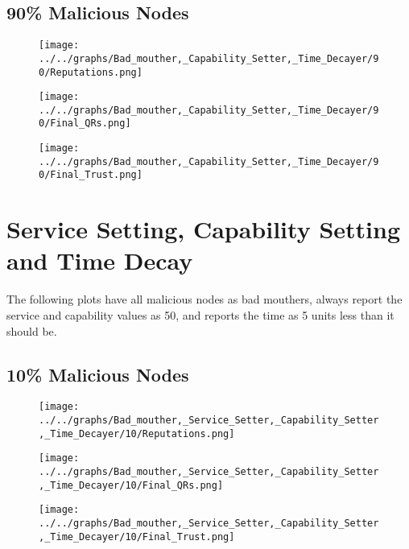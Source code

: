 \begin{minipage}[t]{0.49\columnwidth}
\subsection*{90\% Malicious Nodes}
    \begin{figure}[H]
        \centering
        \texttt{[image: ../../graphs/Bad\_mouther,\_Capability\_Setter,\_Time\_Decayer/90/Reputations.png]}
    \end{figure}
    \begin{figure}[H]
        \centering
        \texttt{[image: ../../graphs/Bad\_mouther,\_Capability\_Setter,\_Time\_Decayer/90/Final\_QRs.png]}
    \end{figure}
\end{minipage}
\begin{minipage}[t]{0.49\columnwidth}
    \begin{figure}[H]
        \centering
        \texttt{[image: ../../graphs/Bad\_mouther,\_Capability\_Setter,\_Time\_Decayer/90/Final\_Trust.png]}
    \end{figure}
\end{minipage}
\newpage

\section*{Service Setting, Capability Setting and Time Decay}
The following plots have all malicious nodes as bad mouthers, always
report the service and capability values as 50, and reports the time as
5 units less than it should be.
\\
\begin{minipage}[t]{0.49\columnwidth}
\subsection*{10\% Malicious Nodes}
    \begin{figure}[H]
        \centering
        \texttt{[image: ../../graphs/Bad\_mouther,\_Service\_Setter,\_Capability\_Setter,\_Time\_Decayer/10/Reputations.png]}
    \end{figure}
    \begin{figure}[H]
        \centering
        \texttt{[image: ../../graphs/Bad\_mouther,\_Service\_Setter,\_Capability\_Setter,\_Time\_Decayer/10/Final\_QRs.png]}
    \end{figure}
\end{minipage}
\begin{minipage}[t]{0.49\columnwidth}
    \begin{figure}[H]
        \centering
        \texttt{[image: ../../graphs/Bad\_mouther,\_Service\_Setter,\_Capability\_Setter,\_Time\_Decayer/10/Final\_Trust.png]}
    \end{figure}
\end{minipage}

